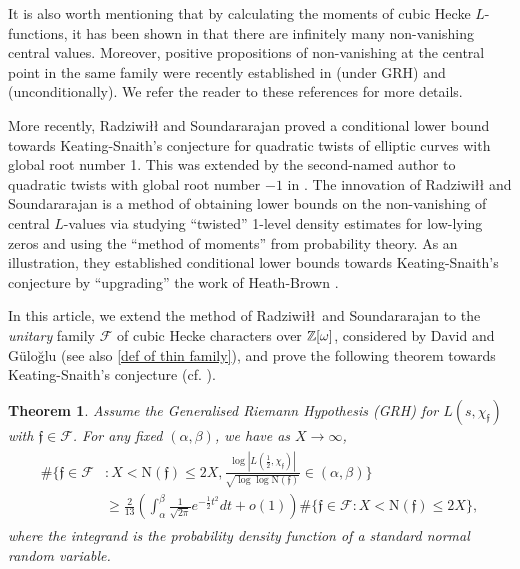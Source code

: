 \documentclass[11pt]{amsart}
\newcommand{\norm}{\mathrm{N}}
\newtheorem{theorem}[prop]{Theorem}
\numberwithin{equation}{section}
\theoremstyle{remark}
\newcommand{\pj}[1]{{\color{blue} \sf  PJ: #1}}
\begin{document}
It is also worth mentioning that by calculating the moments of cubic Hecke $ L$-functions, it has been shown in \cite{BY,G} that there are infinitely many non-vanishing central values. 
Moreover, positive propositions of non-vanishing at the central point in the same family
were recently established in \cite{GY} (under GRH) and \cite{DdeFDS} (unconditionally). 
We refer the reader to these references for more details.


More recently, {Radziwi\l\l} and Soundararajan \cite{RaSo} proved a conditional lower bound towards Keating-Snaith's conjecture for quadratic twists of elliptic curves with global root number 1. This was extended by the second-named author to quadratic twists with global root number $-1$ in \cite{Wo}. The innovation of {Radziwi\l\l} and Soundararajan is a method of obtaining lower bounds on the non-vanishing of central $L$-values via studying ``twisted'' 1-level density estimates for low-lying zeros and using the ``method of moments'' from probability theory. As an illustration, they established conditional lower bounds towards Keating-Snaith's conjecture by ``upgrading'' the work of Heath-Brown \cite{H-B}.

In this article, we extend the method of Radziwi\l\l\ and Soundararajan \cite{RaSo} to the \emph{unitary} family $\mathcal{F}$ of cubic Hecke characters over $\Bbb{Z}[\omega]$, considered by David and G\"{u}lo\u{g}lu \cite{DG} (see also \eqref{def of thin family}), and prove the following theorem towards Keating-Snaith's conjecture (cf. \cite[pg. 59, (iii)]{KS-zeta}). 

\begin{theorem}\label{main-thm}
		\label{KSLB}
		Assume the Generalised Riemann Hypothesis (GRH) for $L(s, \chi_\mathfrak{f})$ with
        $\mathfrak{f}\in\mathcal{F}$. For any fixed 
        $(\alpha,\beta)$, we have as $ X \rightarrow \infty$,
		\begin{align*}
			\begin{split}
				\#\bigg\{ \mathfrak{f}\in\mathcal{F} &: X< \norm (\mathfrak{f})\le 2X,   \frac{\log |L(\frac{1}{2}, \chi_\mathfrak{f})|  }{\sqrt{ \log \log \norm(\mathfrak{f})}} \in (\alpha,\beta) \bigg\}\\
				&\ge \frac{2}{13}\left(\int_\alpha^\beta \frac{1}{\sqrt{ 2\pi}}e^{-\frac{1}{2} t^2} dt +o(1) \right)
				\# \{ \mathfrak{f} \in\mathcal{F} :  X< \norm(\mathfrak{f})\le 2X\},
			\end{split}
		\end{align*}
        where the integrand is the probability density function of a standard normal random variable.
    \end{theorem}
\noindent
\end{document}
